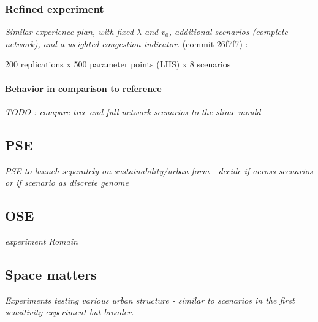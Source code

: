 \subsubsection{Refined experiment}

\textit{Similar experience plan, with fixed $\lambda$ and $v_0$, additional scenarios (complete network), and a weighted congestion indicator.} (\href{https://github.com/JusteRaimbault/Governance/commit/2186d50f90aa0df81bc611b618e1dbaca04776c5}{commit 26f7f7}) :

200 replications x 500 parameter points (LHS) x 8 scenarios






\paragraph{Behavior in comparison to reference}

\textit{TODO : compare tree and full network scenarios to the slime mould}




\subsection{PSE}

\textit{PSE to launch separately on sustainability/urban form - decide if across scenarios or if scenario as discrete genome}


\subsection{OSE}

\textit{experiment Romain}



\subsection{Space matters}

\textit{Experiments testing various urban structure - similar to scenarios in the first sensitivity experiment but broader.}










